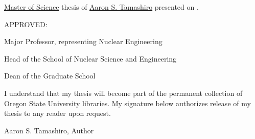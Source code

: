 
\thispagestyle{empty}

\noindent \underline{Master of Science} thesis of
	  \underline{Aaron S. Tamashiro} presented on
	  \underline{\myDefenseDate}.

\vspace{0.5in}

\noindent APPROVED:

\vspace{1.0in}

\noindent \hrulefill 

\noindent Major Professor, representing Nuclear Engineering

\vspace{1.0in}

\noindent \hrulefill

\noindent Head of the School of Nuclear Science and Engineering

\vspace{1.0in}

\noindent \hrulefill

\noindent Dean of the Graduate School

\vspace{1.0in}

\noindent I understand that my thesis will become part of the
	  permanent collection of Oregon State University
	  libraries.  My signature below authorizes release 
	  of my thesis to any reader upon request.

\vspace{0.9in}

\noindent \hrulefill 

\begin{center}
   Aaron S. Tamashiro, Author
\end{center}

